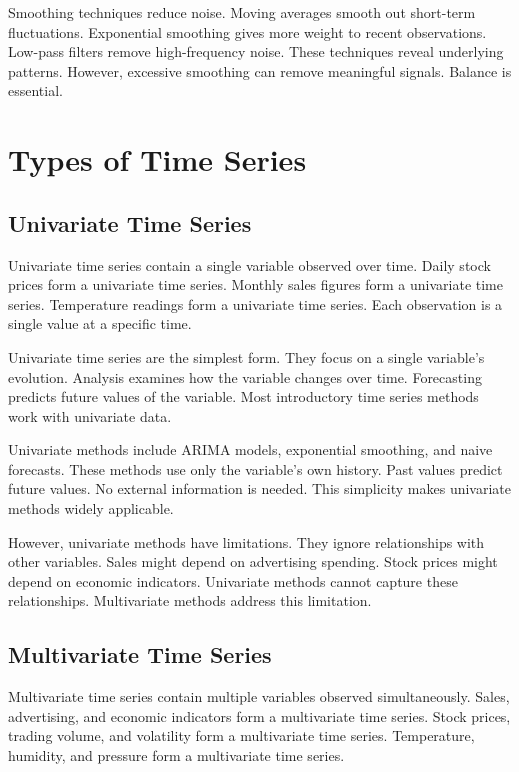 Smoothing techniques reduce noise. Moving averages smooth out short-term fluctuations. Exponential smoothing gives more weight to recent observations. Low-pass filters remove high-frequency noise. These techniques reveal underlying patterns. However, excessive smoothing can remove meaningful signals. Balance is essential.

\section{Types of Time Series}

\subsection{Univariate Time Series}

Univariate time series contain a single variable observed over time. Daily stock prices form a univariate time series. Monthly sales figures form a univariate time series. Temperature readings form a univariate time series. Each observation is a single value at a specific time.

Univariate time series are the simplest form. They focus on a single variable's evolution. Analysis examines how the variable changes over time. Forecasting predicts future values of the variable. Most introductory time series methods work with univariate data.

Univariate methods include ARIMA models, exponential smoothing, and naive forecasts. These methods use only the variable's own history. Past values predict future values. No external information is needed. This simplicity makes univariate methods widely applicable.

However, univariate methods have limitations. They ignore relationships with other variables. Sales might depend on advertising spending. Stock prices might depend on economic indicators. Univariate methods cannot capture these relationships. Multivariate methods address this limitation.

\subsection{Multivariate Time Series}

Multivariate time series contain multiple variables observed simultaneously. Sales, advertising, and economic indicators form a multivariate time series. Stock prices, trading volume, and volatility form a multivariate time series. Temperature, humidity, and pressure form a multivariate time series.

